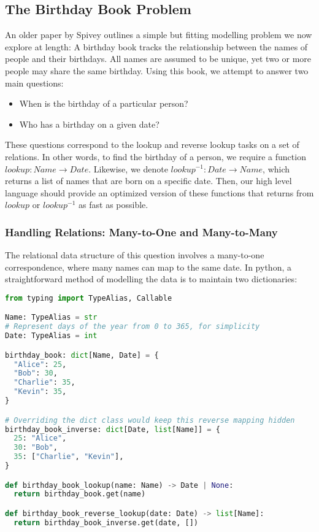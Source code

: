 \documentclass{article}
\begin{document}
\subsection{The Birthday Book Problem}

An older paper by Spivey \cite{spivey1989birthday} outlines a simple but fitting modelling problem we now explore at length: A birthday book tracks the relationship between the names of people and their birthdays. All names are assumed to be unique, yet two or more people may share the same birthday. Using this book, we attempt to answer two main questions:
\begin{itemize}
  \item When is the birthday of a particular person?
  \item Who has a birthday on a given date?
\end{itemize}
These questions correspond to the lookup and reverse lookup tasks on a set of relations. In other words, to find the birthday of a person, we require a function $lookup: Name \rightarrow Date$. Likewise, we denote $lookup^{-1}: Date \rightarrow {{Name}}$, which returns a list of names that are born on a specific date. Then, our high level language should provide an optimized version of these functions that returns from $lookup$ or $lookup^{-1}$ as fast as possible.

\subsubsection{Handling Relations: Many-to-One and Many-to-Many}

The relational data structure of this question involves a many-to-one correspondence, where many names can map to the same date. In python, a straightforward method of modelling the data is to maintain two dictionaries:

\begin{lstlisting}[language=python]
from typing import TypeAlias, Callable

Name: TypeAlias = str
# Represent days of the year from 0 to 365, for simplicity
Date: TypeAlias = int

birthday_book: dict[Name, Date] = {
  "Alice": 25,
  "Bob": 30,
  "Charlie": 35,
  "Kevin": 35,
}

# Overriding the dict class would keep this reverse mapping hidden
birthday_book_inverse: dict[Date, list[Name]] = {
  25: "Alice",
  30: "Bob",
  35: ["Charlie", "Kevin"],
}

def birthday_book_lookup(name: Name) -> Date | None:
  return birthday_book.get(name)

def birthday_book_reverse_lookup(date: Date) -> list[Name]:
  return birthday_book_inverse.get(date, [])
\end{lstlisting}
\end{document}
